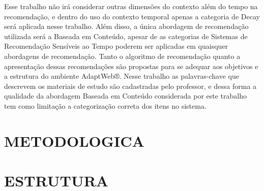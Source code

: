 Esse trabalho não irá considerar outras dimensões do contexto além do tempo na recomendação, e dentro do uso do contexto
temporal apenas a categoria de Decay será aplicada nesse trabalho. Além disso, a única abordagem de recomendação
utilizada será a Baseada em Conteúdo, apesar de as categorias de Sistemas de Recomendação Sensíveis ao Tempo poderem ser
aplicadas em quaisquer abordagens de recomendação. Tanto o algoritmo de recomendação quanto a apresentação dessas
recomendações são propostas para se adequar aos objetivos e a estrutura do ambiente AdaptWeb®. Nesse trabalho as
palavras-chave que descrevem os materiais de estudo são cadastradas pelo professor, e dessa forma a qualidade da
abordagem Baseada em Conteúdo considerada por este trabalho tem como limitação a categorização correta dos itens no
sistema.

\section{\uppercase{Metodologica}}

\section{\uppercase{Estrutura}}



